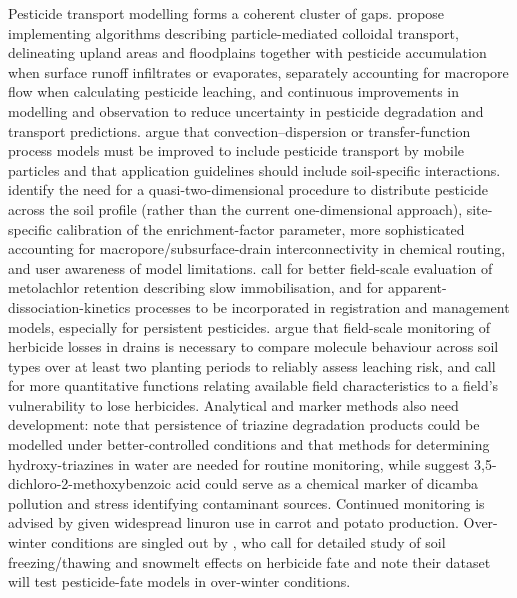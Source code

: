 \documentclass[11pt]{article}
\begin{document}
Pesticide transport modelling forms a coherent cluster of gaps. \textcite{Wendell2024} propose implementing algorithms describing particle-mediated colloidal transport, delineating upland areas and floodplains together with pesticide accumulation when surface runoff infiltrates or evaporates, separately accounting for macropore flow when calculating pesticide leaching, and continuous improvements in modelling and observation to reduce uncertainty in pesticide degradation and transport predictions. \textcite{Zehe2001} argue that convection--dispersion or transfer-function process models must be improved to include pesticide transport by mobile particles and that application guidelines should include soil-specific interactions. \textcite{Fox2007b} identify the need for a quasi-two-dimensional procedure to distribute pesticide across the soil profile (rather than the current one-dimensional approach), site-specific calibration of the enrichment-factor parameter, more sophisticated accounting for macropore/subsurface-drain interconnectivity in chemical routing, and user awareness of model limitations. \textcite{Novak2003} call for better field-scale evaluation of metolachlor retention describing slow immobilisation, and for apparent-dissociation-kinetics processes to be incorporated in registration and management models, especially for persistent pesticides. \textcite{Dousset2004} argue that field-scale monitoring of herbicide losses in drains is necessary to compare molecule behaviour across soil types over at least two planting periods to reliably assess leaching risk, and \textcite{Leu2004} call for more quantitative functions relating available field characteristics to a field's vulnerability to lose herbicides. Analytical and marker methods also need development: \textcite{MUIR1978} note that persistence of triazine degradation products could be modelled under better-controlled conditions and that methods for determining hydroxy-triazines in water are needed for routine monitoring, while \textcite{Heaven2012} suggest 3,5-dichloro-2-methoxybenzoic acid could serve as a chemical marker of dicamba pollution and stress identifying contaminant sources. Continued monitoring is advised by \textcite{Gordon2005} given widespread linuron use in carrot and potato production. Over-winter conditions are singled out by \textcite{Siimes2006}, who call for detailed study of soil freezing/thawing and snowmelt effects on herbicide fate and note their dataset will test pesticide-fate models in over-winter conditions.
\end{document}
